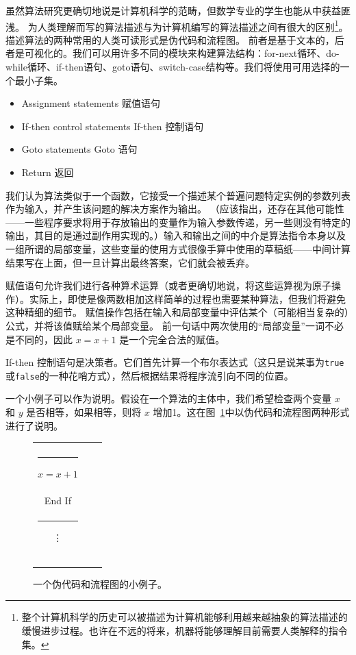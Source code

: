 虽然算法研究更确切地说是计算机科学的范畴，但数学专业的学生也能从中获益匪浅。
为人类理解而写的算法描述与为计算机编写的算法描述之间有很大的区别\footnote{整个计算机科学的历史可以被描述为计算机能够利用越来越抽象的算法描述的缓慢进步过程。也许在不远的将来，机器将能够理解目前需要人类解释的指令集。}。
描述算法的两种常用的人类可读形式是伪代码和流程图。
前者是基于文本的，后者是可视化的。我们可以用许多不同的模块来构建算法结构：for-next循环、do-while循环、if-then语句、goto语句、switch-case结构等。我们将使用可用选择的一个最小子集。

\begin{itemize}
  \item Assignment statements 赋值语句
  \item If-then control statements If-then 控制语句
  \item Goto statements Goto 语句
  \item Return 返回
\end{itemize}

我们认为算法类似于一个函数，它接受一个描述某个普遍问题特定实例的参数列表作为输入，并产生该问题的解决方案作为输出。
（应该指出，还存在其他可能性——一些程序要求将用于存放输出的变量作为输入参数传递，另一些则没有特定的输出，其目的是通过副作用实现的。）输入和输出之间的中介是算法指令本身以及一组所谓的局部变量，这些变量的使用方式很像手算中使用的草稿纸——中间计算结果写在上面，但一旦计算出最终答案，它们就会被丢弃。

赋值语句允许我们进行各种算术运算（或者更确切地说，将这些运算视为原子操作）。实际上，即使是像两数相加这样简单的过程也需要某种算法，但我们将避免这种精细的细节。
赋值操作包括在输入和局部变量中评估某个（可能相当复杂的）公式，并将该值赋给某个局部变量。
前一句话中两次使用的“局部变量”一词不必是不同的，因此 $x = x + 1$ 是一个完全合法的赋值。

If-then 控制语句是决策者。它们首先计算一个布尔表达式（这只是说某事为{\tt true}或{\tt false}的一种花哨方式），然后根据结果将程序流引向不同的位置。

一个小例子可以作为说明。假设在一个算法的主体中，我们希望检查两个变量 $x$ 和 $y$ 是否相等，如果相等，则将 $x$ 增加1。这在图~\ref{fig:if-then}中以伪代码和流程图两种形式进行了说明。

\begin{figure}[!hbt]
  \begin{tabular}{ccc}
    
    & \hspace{1in} &
    \begin{minipage}[b]{.3\textwidth}
      \tt If $x=y$ then \\
      \rule{15pt}{0pt}  $x=x+1$ \\
      End If \\
      \rule{30pt}{0pt} \vdots\\
      \\
      \\
    \end{minipage} \\
  \end{tabular}
  \caption{一个伪代码和流程图的小例子。}
  \label{fig:if-then}
\end{figure}

